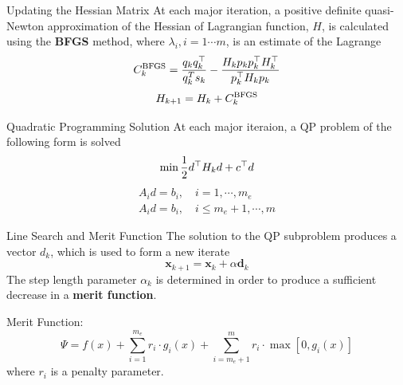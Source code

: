 \documentclass[10pt, compress]{beamer}
\begin{document}
\begin{frame}[fragile]{Updating the Hessian Matrix}
At each major iteration, a positive definite quasi-Newton approximation of the Hessian of Lagrangian function, $H$, is calculated using the \textbf{BFGS} method, where $\lambda_i, i = 1\cdots m$, is an estimate of the Lagrange
$$C_k^{\rm BFGS} = {q_kq_k^\top \over q_k^T s_k} - {H_k p_k p_k^\top H_k^\top \over p_k^\top H_k p_k}$$
$$H_{k+1} = H_{k} + C_k^{\rm BFGS}$$
\end{frame}

\begin{frame}[fragile]{Quadratic Programming Solution}
At each major iteraion, a QP problem of the following form is solved
$$\min {1 \over 2} d^\top H_k d + c^\top d$$
\begin{eqnarray*}
A_i d = b_i, \quad i = 1,\cdots , m_e \\
A_i d = b_i, \quad i \leq m_e + 1,\cdots , m
\end{eqnarray*}
\end{frame}

\begin{frame}[fragile]{Line Search and Merit Function}
The solution to the QP subproblem produces a vector $d_k$, which is used to form a new iterate
$$\boldsymbol{x}_{k+1} = \boldsymbol{x}_k + \alpha \boldsymbol{d}_k$$
The step length parameter $\alpha_k$ is determined in order to produce a sufficient decrease in a \textbf{merit function}. 

Merit Function:
$$\Psi = f(x) + \sum_{i = 1}^{m_e} r_i \cdot g_i(x) + \sum_{i = m_e + 1}^{m} r_i \cdot \max [0, g_i(x)]$$
where $r_i$ is a penalty parameter.
\end{frame}
\end{document}

